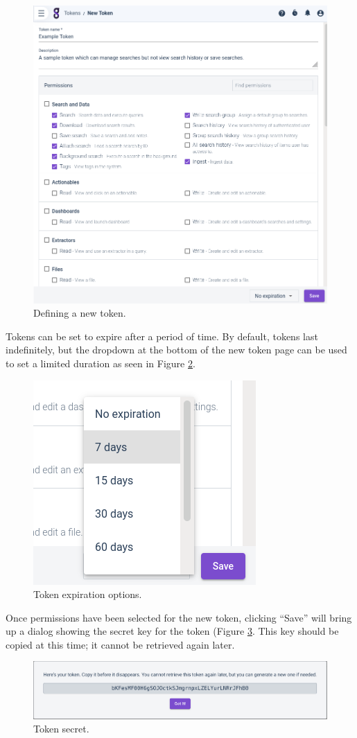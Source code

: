 \begin{figure}
	\includegraphics[width=0.8\linewidth]{images/new-token.png}
	\caption{Defining a new token.}
	\label{fig:new-token}
\end{figure}

Tokens can be set to expire after a period of time. By default, tokens last indefinitely, but the dropdown at the bottom of the new token page can be used to set a limited duration as seen in Figure \ref{fig:token-expiration}.

\begin{figure}
	\includegraphics[width=0.4\linewidth]{images/token-expiration.png}
	\caption{Token expiration options.}
	\label{fig:token-expiration}
\end{figure}

Once permissions have been selected for the new token, clicking ``Save'' will bring up a dialog showing the secret key for the token (Figure \ref{fig:token-secret}. This key should be copied at this time; it cannot be retrieved again later.

\begin{figure}
	\includegraphics[width=0.7\linewidth]{images/token-secret.png}
	\caption{Token secret.}
	\label{fig:token-secret}
\end{figure}

